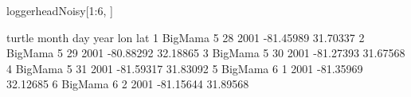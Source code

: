 \begin{Schunk}
\begin{Sinput}
 loggerheadNoisy[1:6, ]
\end{Sinput}
\begin{Soutput}
   turtle month day year       lon      lat
1 BigMama     5  28 2001 -81.45989 31.70337
2 BigMama     5  29 2001 -80.88292 32.18865
3 BigMama     5  30 2001 -81.27393 31.67568
4 BigMama     5  31 2001 -81.59317 31.83092
5 BigMama     6   1 2001 -81.35969 32.12685
6 BigMama     6   2 2001 -81.15644 31.89568
\end{Soutput}
\end{Schunk}
